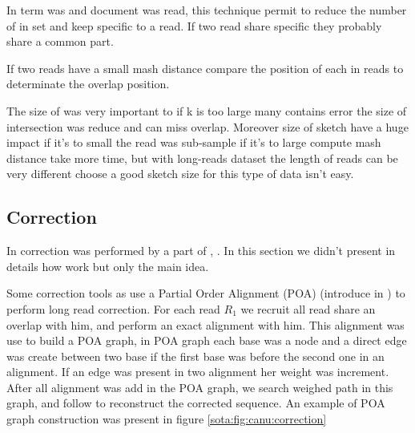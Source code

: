 \documentclass[main]{subfiles}
\begin{document}
In \mhap term was \kmer and document was read, this technique permit to reduce the number of \kmer in set and keep \kmer specific to a read. If two read share specific \kmer they probably share a common part.

If two reads have a small mash distance \mhap compare the position of each \kmer in reads to determinate the overlap position.

The size of \kmer was very important to if k is too large many \kmer contains error the size of intersection was reduce and \mhap can miss overlap. Moreover size of sketch have a huge impact if it's to small the read was sub-sample if it's to large compute mash distance take more time, but with long-reads dataset the length of reads can be very different choose a good sketch size for this type of data isn't easy.


\subsection{Correction}

In \canu correction was performed by a part of  \cite{falcon}, .  In this section we didn't present in details how  work but only the main idea.

Some correction tools as  use a Partial Order Alignment (POA) (introduce in \cite{poa}) to perform long read correction. For each read \texttt{$R_1$} we recruit all read share an overlap with him, and perform an exact alignment with him. This alignment was use to build a POA graph, in POA graph each base was a node and a direct edge was create between two base if the first base was before the second one in an alignment. If an edge was present in two alignment her weight was increment. After all alignment was add in the POA graph, we search weighed path in this graph, and follow to reconstruct the corrected sequence. An example of POA graph construction was present in figure \ref{sota:fig:canu:correction}
\end{document}
